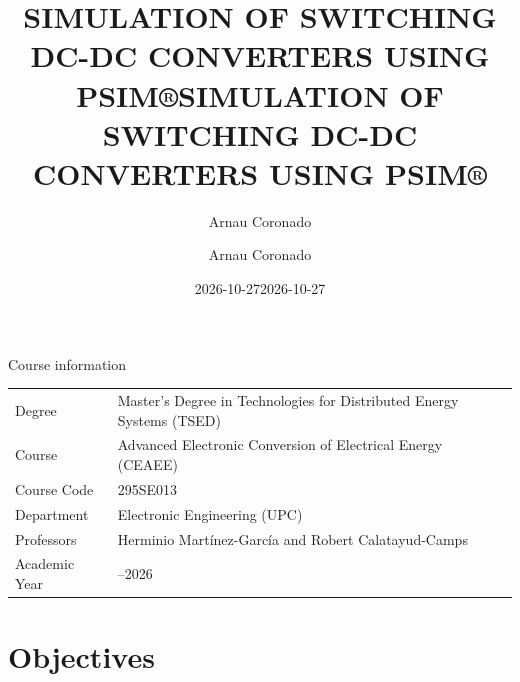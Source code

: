 \documentclass[
  paper=a4,
  oneside  ,captions=tableheading
]{scrartcl}
\title{SIMULATION OF SWITCHING DC-DC CONVERTERS USING PSIM®}
\author{Arnau Coronado}
\date{2026-10-27}
\title{SIMULATION OF SWITCHING DC-DC CONVERTERS USING PSIM®}
\author{Arnau Coronado}
\date{2026-10-27}
\newcounter{none}
\renewcommand*\contentsname{Table of contents}
\newcommand\contentsname{Table of contents}
\begin{document}
\begin{titlepage}
\newcommand{\colorRule}[3][black]{\textcolor[HTML]{#1}{\rule{#2}{#3}}}
\end{titlepage}
\restoregeometry
{}




\renewcommand*\contentsname{Table of contents}
{
\hypersetup{linkcolor=}
\setcounter{tocdepth}{3}
\tableofcontents
\newpage
}
Course information

{\def\LTcaptype{none} %
\begin{longtable}[]{@{}
  >{\raggedright\arraybackslash}p{}
  >{\raggedright\arraybackslash}p{}@{}}
\toprule\noalign{}
\endhead
\bottomrule\noalign{}
\endlastfoot
Degree & Master's Degree in Technologies for Distributed Energy Systems
(TSED) \\
Course & Advanced Electronic Conversion of Electrical Energy (CEAEE) \\
Course Code & 295SE013 \\
Department & Electronic Engineering (UPC) \\
Professors & Herminio Martínez-García and Robert Calatayud-Camps \\
Academic Year & 2025--2026 \\
\end{longtable}
}

\section{Objectives}\label{objectives}
\end{document}
